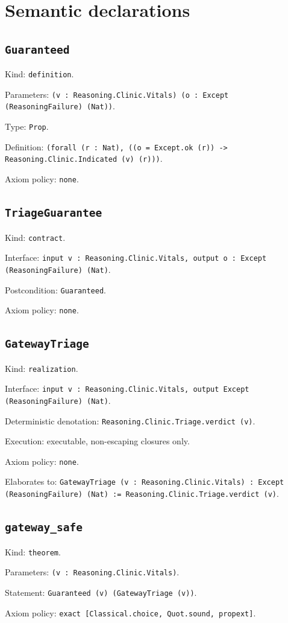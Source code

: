 \documentclass[11pt]{article}
\begin{document}
\section*{Semantic declarations}
\subsection*{\texttt{Guaranteed}}
\noindent Kind: \texttt{definition}.\par
\noindent Parameters: \texttt{(v : Reasoning.Clinic.Vitals) (o : Except (ReasoningFailure) (Nat))}.\par
\noindent Type: \texttt{Prop}.\par
\noindent Definition: \texttt{(forall (r : Nat), ((o = Except.ok (r)) -> Reasoning.Clinic.Indicated (v) (r)))}.\par
\noindent Axiom policy: \texttt{none}.\par
\subsection*{\texttt{TriageGuarantee}}
\noindent Kind: \texttt{contract}.\par
\noindent Interface: \texttt{input v : Reasoning.Clinic.Vitals, output o : Except (ReasoningFailure) (Nat)}.\par
\noindent Postcondition: \texttt{Guaranteed}.\par
\noindent Axiom policy: \texttt{none}.\par
\subsection*{\texttt{GatewayTriage}}
\noindent Kind: \texttt{realization}.\par
\noindent Interface: \texttt{input v : Reasoning.Clinic.Vitals, output Except (ReasoningFailure) (Nat)}.\par
\noindent Deterministic denotation: \texttt{Reasoning.Clinic.Triage.verdict (v)}.\par
\noindent Execution: executable, non-escaping closures only.\par
\noindent Axiom policy: \texttt{none}.\par
\noindent Elaborates to: \texttt{GatewayTriage (v : Reasoning.Clinic.Vitals) : Except (ReasoningFailure) (Nat) := Reasoning.Clinic.Triage.verdict (v)}.\par
\subsection*{\texttt{gateway\_safe}}
\noindent Kind: \texttt{theorem}.\par
\noindent Parameters: \texttt{(v : Reasoning.Clinic.Vitals)}.\par
\noindent Statement: \texttt{Guaranteed (v) (GatewayTriage (v))}.\par
\noindent Axiom policy: \texttt{exact [Classical.choice, Quot.sound, propext]}.\par
\end{document}

